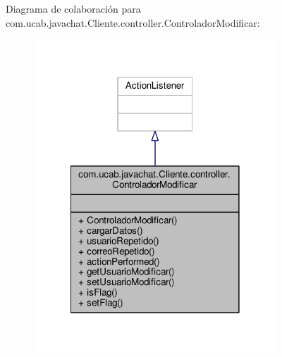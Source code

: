 Diagrama de colaboración para com.\-ucab.\-javachat.\-Cliente.\-controller.\-Controlador\-Modificar\-:
\nopagebreak
\begin{figure}[H]
\begin{center}
\leavevmode
\includegraphics[width=258pt]{dc/d5d/classcom_1_1ucab_1_1javachat_1_1_cliente_1_1controller_1_1_controlador_modificar__coll__graph}
\end{center}
\end{figure}
